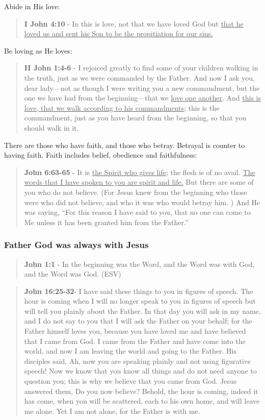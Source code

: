 \documentclass[11pt]{article}
\begin{document}
Abide in His love:

\begin{quote}
\textbf{I John 4:10} - In this is love, not that we have loved God but \uline{that he loved us and sent his Son to be the propitiation for our sins.}
\end{quote}

Be loving as He loves:

\begin{quote}
\textbf{II John 1:4-6} - I rejoiced greatly to find some of your children walking in the truth, just as we were commanded by the Father. And now I ask you, dear lady—not as though I were writing you a new commandment, but the one we have had from the beginning—that we \uline{love one another}. And \uline{this is love, that we walk according to his commandments}; this is the commandment, just as you have heard from the beginning, so that you should walk in it.
\end{quote}

There are those who have faith, and those who betray. Betrayal is counter to having faith. Faith includes belief, obedience and faithfulness:

\begin{quote}
\textbf{John 6:63-65} - It is \uline{the Spirit who gives life}; the flesh is of no avail. \uline{The words that I have spoken to you are spirit and life.} But there are some of you who do not believe. (For Jesus knew from the beginning who those were who did not believe, and who it was who would betray him. ) And He was saying, “For this reason I have said to you, that no one can come to Me unless it has been granted him from the Father.”
\end{quote}

\subsubsection{Father God was always with Jesus}
\label{sec:orga1312c9}
\begin{quote}
\textbf{John 1:1} - In the beginning was the Word, and the Word was with God, and the Word was God. (ESV)
\end{quote}

\begin{quote}
\textbf{John 16:25-32}- I have said these things to you in figures of speech. The hour is coming when I will no longer speak to you in figures of speech but will tell you plainly about the Father. In that day you will ask in my name, and I do not say to you that I will ask the Father on your behalf; for the Father himself loves you, because you have loved me and have believed that I came from God. I came from the Father and have come into the world, and now I am leaving the world and going to the Father. His disciples said, Ah, now you are speaking plainly and not using figurative speech! Now we know that you know all things and do not need anyone to question you; this is why we believe that you came from God. Jesus answered them, Do you now believe? Behold, the hour is coming, indeed it has come, when you will be scattered, each to his own home, and will leave me alone. Yet I am not alone, for the Father is with me.
\end{quote}
\end{document}
